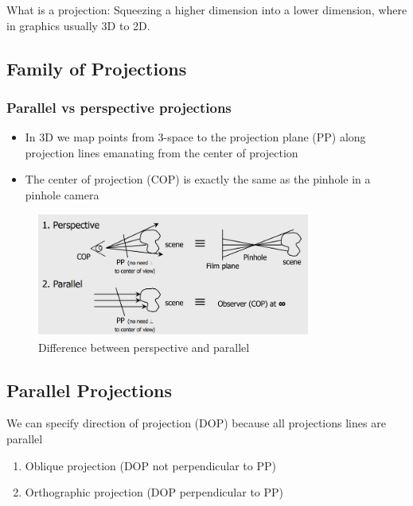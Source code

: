 \documentclass[11pt]{article}
\begin{document}
What is a projection:
Squeezing a higher dimension into a lower dimension, where in graphics usually 3D to 2D.


\subsection{Family of Projections}
\subsubsection*{Parallel vs perspective projections}
\begin{itemize}
    \item In 3D we map points from 3-space to the projection plane (PP) along projection lines emanating from the center of projection
    \item The center of projection (COP) is exactly the same as the pinhole in a pinhole camera
\end{itemize}

\begin{figure}[h]
    \centering
    \includegraphics[width=0.8\textwidth]{par_vs_pers.png}
    \caption{Difference between perspective and parallel}
    \label{fig:par_vs_pers}
\end{figure}

\subsection{Parallel Projections}
We can specify direction of projection (DOP) because all projections lines are parallel
\begin{enumerate}
    \item Oblique projection (DOP not perpendicular to PP) 
    \item Orthographic projection (DOP perpendicular to PP)
\end{enumerate}
\end{document}
